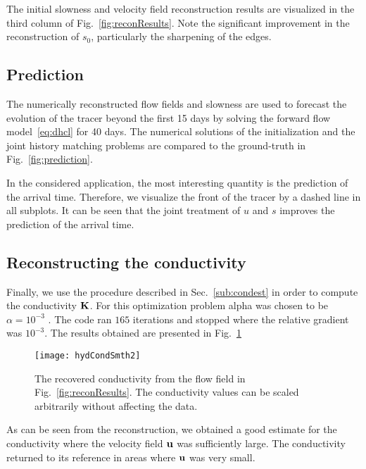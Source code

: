 \documentclass[english]{siamltex}
\newcommand {\bfu}   { {\bf u} }
\newcommand {\bfK}  { {\bf K} }
\begin{document}
 
The initial slowness and velocity field reconstruction results are visualized in the third column of Fig.~\ref{fig:reconResults}. Note the significant improvement in the reconstruction of $s_0$, particularly the sharpening of the edges. 


\subsection{Prediction} %
\label{sub:prediction}

The numerically reconstructed flow fields and slowness are used to forecast the evolution of the tracer beyond the first 15 days by solving the forward flow model~\eqref{eq:dhcl} for 40 days. The numerical solutions of the initialization  and the joint history matching problems are compared to the ground-truth in Fig.~\ref{fig:prediction}. 

In the considered application, the most interesting quantity is the prediction of the arrival time. Therefore, we visualize the front of the tracer by a dashed line in all subplots. It can be seen that the joint treatment of $u$ and $s$ improves the prediction of the arrival time.


\subsection{Reconstructing the conductivity} %
\label{sub:reconstructing_hydraulic_conductivity}

Finally, we use the procedure described in Sec.~\ref{sub:condest} in order to compute the 
conductivity $\bfK$. For this optimization problem alpha was chosen to be $\alpha = 10^{-3}$ . The code ran $165$ iterations
and stopped where the relative gradient was $10^{-3}$. The results obtained are presented
in Fig.~\ref{fig:condest}
\begin{figure}[t]
\begin{center}
\texttt{[image: hydCondSmth2]}
\caption{The recovered conductivity from the flow field in Fig.~\ref{fig:reconResults}.
The conductivity values can be scaled arbitrarily without affecting the data.  \label{fig:condest}}
\end{center}
\end{figure}
As can be seen from the reconstruction, we obtained a good estimate for the conductivity where the velocity
field $\bfu$ was sufficiently large. The conductivity returned to its reference in areas where $\bfu$ was very small.
\end{document}
